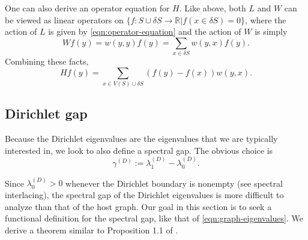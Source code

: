   One can also derive an operator equation for $H$. Like above, both $L$ and $W$ can be viewed as linear operators on $\{f:S\cup \delta S \rightarrow \mathbb{R} \vert f(x\in\delta S) = 0\}$, where the action of $L$ is given by \cref{eqn:operator-equation} and the action of $W$ is simply
  \[
    Wf(y) = w(y,y)f(y) = \sum_{x \in \delta S} w(y,x)f(y).
  \]
  Combining these facts,
  \begin{equation}\label{eqn:operator-dirichlet}
    Hf(y) = \sum_{x \in V(S) \cup \delta S} (f(y)-f(x))w(y,x).
  \end{equation}
  
  \subsection{Dirichlet gap}
    Because the Dirichlet eigenvalues are the eigenvalues that we are typically interested in, we look to also define a spectral gap. The obvious choice is
    \begin{equation}\label{eqn:spectral-gap}
        \gamma^{(D)} := \lambda_1^{(D)} - \lambda_0^{(D)}.
    \end{equation}
    
    Since $\lambda_0^{(D)} > 0$ whenever the Dirichlet boundary is nonempty (see spectral interlacing), the spectral gap of the Dirichlet eigenvalues is more difficult to analyze than that of the host graph. Our goal in this section is to seek a functional definition for the spectral gap, like that of \cref{eqn:graph-eigenvalues}. We derive a theorem similar to Proposition 1.1 of \cite{Chung2000}.
    
